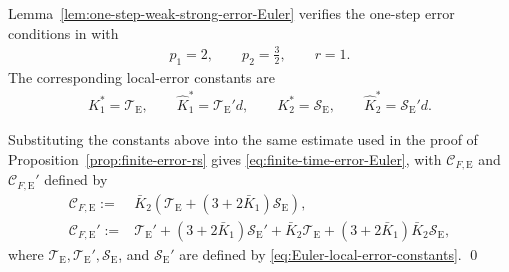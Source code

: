 \documentclass[12pt]{article}
\newenvironment{redtext}
  {\color{black}\ignorespaces}
  {\ignorespacesafterend}
\numberwithin{equation}{section}
\renewenvironment{proof}%
  {\begin{trivlist}%
   \item[]\ignorespaces}%
  {\qed\end{trivlist}}
\begin{document}
\begin{redtext}
\begin{redtext}
\begin{proof}
Lemma~\ref{lem:one-step-weak-strong-error-Euler} verifies the
one-step error conditions in \cite[Theorem 3.3]{yang2025non} with
\begin{align}
p_1=2,
\qquad
p_2=\tfrac{3}{2},
\qquad
r=1.
\end{align}
The corresponding local-error constants are
\begin{align}
K_1^*=\mathcal T_{\mathrm E},
\qquad
\hat K_1^*=\mathcal T_{\mathrm E}'d,
\qquad
K_2^*=\mathcal S_{\mathrm E},
\qquad
\hat K_2^*=\mathcal S_{\mathrm E}'d.
\label{eq:Euler-Yang-local-constants}
\end{align}

Substituting the constants above into the same estimate used in the
proof of Proposition~\ref{prop:finite-error-rs} gives
\eqref{eq:finite-time-error-Euler}, with
$\mathcal C_{F,\mathrm E}$ and
$\mathcal C_{F,\mathrm E}'$ defined by
\begin{align}\label{eq:define-C-F-E}
\mathcal C_{F,\mathrm E}
:={}&
\bar K_2
\left(
\mathcal T_{\mathrm E}
+
(3+2\bar K_1)\mathcal S_{\mathrm E}
\right),
\nonumber\\
\mathcal C_{F,\mathrm E}'
:={}&
\mathcal T_{\mathrm E}'
+
(3+2\bar K_1)\mathcal S_{\mathrm E}'
+
\bar K_2\mathcal T_{\mathrm E}
+
(3+2\bar K_1)\bar K_2\mathcal S_{\mathrm E},
\end{align}
where
\(\mathcal T_{\mathrm E},\mathcal T_{\mathrm E}',
\mathcal S_{\mathrm E}\), and \(\mathcal S_{\mathrm E}'\)
are defined by \eqref{eq:Euler-local-error-constants}.
\end{proof}


\end{redtext}

\end{redtext}
\end{document}
